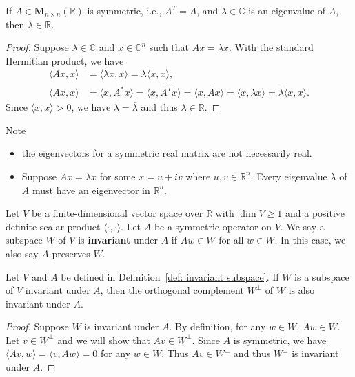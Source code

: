 \documentclass{ctexart}
\newcommand{\M}{\mathbf{M}}
\newcommand{\R}{\mathbb{R}}
\newcommand{\C}{\mathbb{C}}
\begin{document}
    \begin{mythm}\label{thm: eigenvalue of symmetric matrix is real}
        If $A\in \M_{n\times n}(\R)$ is symmetric, i.e., $A^T = A$, and $\lambda \in \C$ is an eigenvalue of $A$, then $\lambda \in \R$.
    \end{mythm}
    \begin{proof}
        Suppose $\lambda \in \C$ and $x\in \C ^n$ such that $A x = \lambda x$. With the standard Hermitian product, we have
        \[
        \begin{aligned}
            \langle A x, x \rangle &= \langle \lambda x, x \rangle = \lambda \langle x, x \rangle,\\
            \langle A x, x \rangle &= \langle x, A^* x \rangle = \langle x, \overline{A^T} x \rangle = \langle x, \overline{A} x \rangle=  \langle x, \lambda x \rangle = \overline{\lambda} \langle x, x \rangle.
        \end{aligned}
        \]
        Since $\langle x, x \rangle > 0$, we have $\lambda = \overline{\lambda}$ and thus $\lambda \in \R$.
    \end{proof}
    \begin{myrmk}
        Note
        \begin{itemize}
            \item the eigenvectors for a symmetric real matrix are not necessarily real.
            \item Suppose $Ax = \lambda x$ for some $x=u+iv$ where $u,v\in \R^n$. Every eigenvalue $\lambda$ of $A$ must have an eigenvector in $\R^n$.
        \end{itemize}
    \end{myrmk}
    \begin{mydef}\label{def: invariant subspace}
        Let $V$ be a finite-dimensional vector space over $\R$ with $\dim V\ge 1$ and a positive definite scalar product $\langle \cdot, \cdot \rangle$. Let $A$ be a symmetric operator on $V$. We say a subspace $W$ of $V$ is \textbf{invariant} under $A$ if $A w \in W$ for all $w\in W$. In this case, we also say $A$ preserves $W$.
    \end{mydef}
    \begin{mylma}
        Let $V$ and $A$ be defined in Definition~\ref{def: invariant subspace}. If $W$ is a subspace of $V$ invariant under $A$, then the orthogonal complement $W^\perp$ of $W$ is also invariant under $A$.
    \end{mylma}
    \begin{proof}
        Suppose $W$ is invariant under $A$. By definition, for any $w\in W$, $Aw\in W$. Let $v\in W^\perp$ and we will show that $Av \in W^\perp$. Since $A$ is symmetric, we have $\langle Av, w \rangle = \langle v, A w \rangle = 0 $ for any $w\in W$. Thus $Av \in W^\perp$ and thus $W^\perp$ is invariant under $A$.
    \end{proof}
\end{document}
